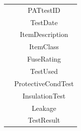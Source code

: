 \begin{center}
\begin{tabular}{|c|c|}
                               & PATtestID                        \\ 
                               & TestDate                         \\ 
                               & ItemDescription                  \\ 
                               & ItemClass                        \\ 
                               & FuseRating                       \\ 
                               & TestUsed                         \\ 
                               & ProtectiveCondTest               \\ 
                               & InsulationTest                   \\ 
                               & Leakage                          \\ 
                               & TestResult                       \\ \hline
    \end{tabular}
\end{center}

\newpage

